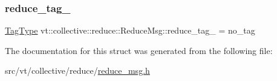 \mbox{\label{structvt_1_1collective_1_1reduce_1_1_reduce_msg_ae095604d8e87dbd30f0aa0242a624fe8}} 
\subsubsection{\texorpdfstring{reduce\+\_\+tag\+\_\+}{reduce\_tag\_}}
{\footnotesize\ttfamily \hyperlink{namespacevt_a84ab281dae04a52a4b243d6bf62d0e52}{Tag\+Type} vt\+::collective\+::reduce\+::\+Reduce\+Msg\+::reduce\+\_\+tag\+\_\+ = no\+\_\+tag}



The documentation for this struct was generated from the following file\+:\begin{DoxyCompactItemize}
\item 
src/vt/collective/reduce/\hyperlink{reduce__msg_8h}{reduce\+\_\+msg.\+h}\end{DoxyCompactItemize}
